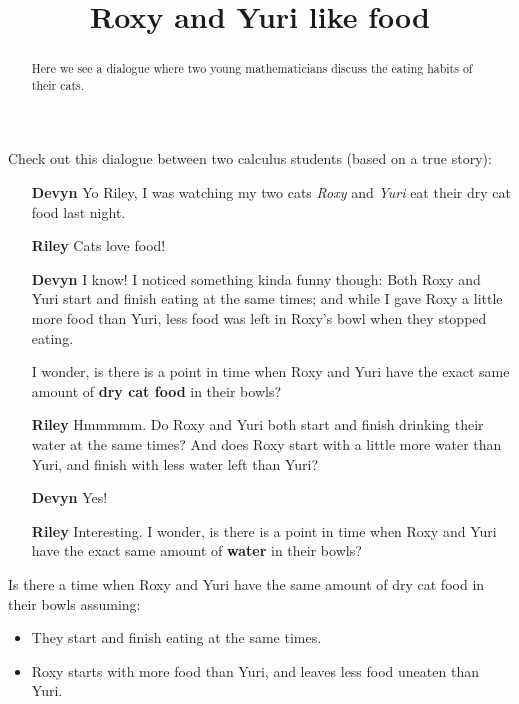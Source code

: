 \documentclass{ximera}
\title[Break-Ground:]{Roxy and Yuri like food}
\begin{document}
\begin{abstract}
Here we see a dialogue where two young mathematicians discuss the eating
habits of their cats.
\end{abstract}
\maketitle

Check out this dialogue between two calculus students (based on a true
story):

\begin{itemize}
  \item[\textbf{Devyn}] Yo Riley, I was watching my two cats
    \textit{Roxy} and \textit{Yuri} eat their dry cat food last night.
\item[\textbf{Riley}] Cats love food!
\item[\textbf{Devyn}] I know! I noticed something kinda funny though:
  Both Roxy and Yuri start and finish eating at the same times; and
  while I gave Roxy a little more food than Yuri, less food was left
  in Roxy's bowl when they stopped eating.

  I wonder, is there is a point in time when Roxy and Yuri have the
  exact same amount of \textbf{dry cat food} in their bowls?
\item[\textbf{Riley}] Hmmmmm. Do Roxy and Yuri both start and finish
  drinking their water at the same times?  And does Roxy start with a
  little more water than Yuri, and finish with less water left than
  Yuri?
  \item[\textbf{Devyn}] Yes!
\item[\textbf{Riley}] Interesting. I wonder, is there is a point in
  time when Roxy and Yuri have the exact same amount of \textbf{water}
  in their bowls?
\end{itemize}

\begin{problem}
  Is there a time when Roxy and Yuri have the same amount of dry cat
  food in their bowls assuming:
  \begin{itemize}
  \item They start and finish eating at the same times.
  \item Roxy starts with more food than Yuri, and leaves less food uneaten than Yuri. 
  \end{itemize}
  \begin{multipleChoice}
  \end{multipleChoice}
\end{problem}
\end{document}
